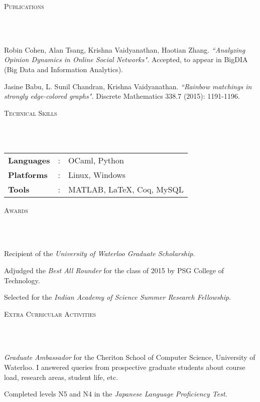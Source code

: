 \documentclass{article}
\newcommand{\header}[1]{{
\hspace*{-15pt}\vspace*{6pt} \textsc{#1}} \vspace*{-6pt} 
\lineunder
}
\newcommand{\lineunder}{
\vspace*{-8pt} \\ \hspace*{-18pt} 
\hrulefill \\
}
\renewcommand{\labelitemii}{
$\vcenter{\hbox{\tiny$\bullet$}}$\hspace*{-3pt}
}
\newenvironment{bullet-list-major}{
\begin{list}{\labelitemii}{\setlength\leftmargin{3pt} 
\topsep 0pt \itemsep -2pt}}{\vspace*{4pt}\end{list}
}
\begin{document}
\vspace*{4pt}%
\header{Publications}
\begin{bullet-list-major}
\item Robin Cohen, Alan Tsang, Krishna Vaidyanathan, Haotian Zhang. 
    \textit{``Analyzing Opinion Dynamics in Online Social Networks".} Accepted, to appear in 
        BigDIA (Big Data and Information Analytics). 
\item Jasine  Babu,  L.  Sunil  Chandran, Krishna  Vaidyanathan.
    \textit{``Rainbow matchings in strongly edge-colored graphs".} Discrete Mathematics 338.7 (2015):  1191-1196.
\end{bullet-list-major}

\vspace*{4pt}%
\header{Technical Skills}
\begin{tabular}{l l l}

\textbf{Languages}&: & OCaml, Python \\
\textbf{Platforms}&:  & Linux, Windows\\
\textbf{Tools}&:     &MATLAB, \LaTeX, Coq, MySQL
\end{tabular}


\vspace*{4pt}%
\header{Awards}
    \begin{bullet-list-major}
    \item Recipient of the \textit{University of Waterloo Graduate Scholarship}.
    \item Adjudged the \textit{Best All Rounder} for the class of 2015 by PSG College of
        Technology. 
    \item Selected for the \textit{Indian Academy of Science Summer Research
            Fellowship}.
    \end{bullet-list-major}

\vspace*{4pt}%
\header{Extra Curricular Activities}
    \begin{bullet-list-major}
    \item \textit{Graduate Ambassador} for the Cheriton School of Computer Science,
        University of Waterloo. I answered queries from prospective graduate
        students about course load, research areas, student life, etc.
    \item Completed levels N5 and N4 in the \textit{Japanese Language
            Proficiency Test}.
    \end{bullet-list-major}
\end{document}
